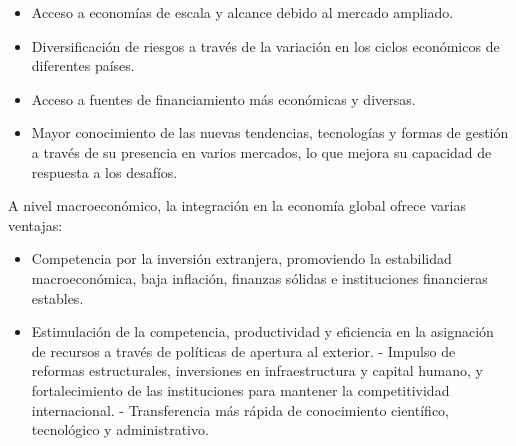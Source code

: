 \documentclass[
  letterpaper,
  DIV=11,
  numbers=noendperiod]{scrartcl}
\providecommand{\tightlist}{%
  \setlength{\itemsep}{0pt}\setlength{\parskip}{0pt}}\usepackage{longtable,booktabs,array}
\begin{document}
\begin{itemize}
\tightlist
\item
  Acceso a economías de escala y alcance debido al mercado ampliado.
\item
  Diversificación de riesgos a través de la variación en los ciclos
  económicos de diferentes países.
\item
  Acceso a fuentes de financiamiento más económicas y diversas.
\item
  Mayor conocimiento de las nuevas tendencias, tecnologías y formas de
  gestión a través de su presencia en varios mercados, lo que mejora su
  capacidad de respuesta a los desafíos.
\end{itemize}

A nivel macroeconómico, la integración en la economía global ofrece
varias ventajas:

\begin{itemize}
\tightlist
\item
  Competencia por la inversión extranjera, promoviendo la estabilidad
  macroeconómica, baja inflación, finanzas sólidas e instituciones
  financieras estables.
\item
  Estimulación de la competencia, productividad y eficiencia en la
  asignación de recursos a través de políticas de apertura al exterior.
  - Impulso de reformas estructurales, inversiones en infraestructura y
  capital humano, y fortalecimiento de las instituciones para mantener
  la competitividad internacional. - Transferencia más rápida de
  conocimiento científico, tecnológico y administrativo.
\end{itemize}
\end{document}
